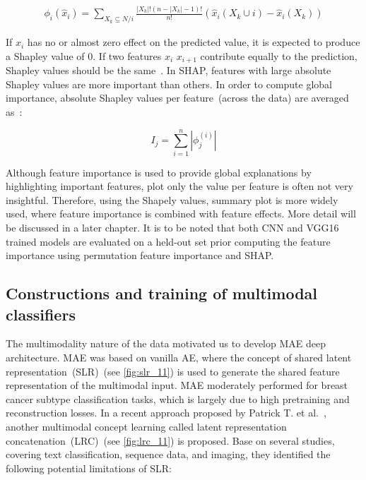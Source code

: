 \vspace{-2mm}
\begin{align}
    \phi_{i}(\hat x_i)=\sum_{X_k \subseteq N / i} \frac{|X_k| !(n-|X_k|-1) !}{n !}(\hat x_i(X_k \cup i)-\hat x_i(X_k))
    \label{eq:shap}
\end{align}

\hspace*{3.5mm} If $x_i$ has no or almost zero effect on the predicted value, it is expected to produce a Shapley value of 0. If two features $x_i$ $x_{i+1}$ contribute equally to the prediction, Shapley values should be the same~\cite{NIPS2017_7062}. In SHAP, features with large absolute Shapley values are more important than others. In order to compute global importance, absolute Shapley values per feature~(across the data) are averaged as~\cite{NIPS2017_7062}:

\begin{equation}
    I_{j}=\sum_{i=1}^{n}\left|\phi_{j}^{(i)}\right|
\end{equation}

\hspace*{3.5mm} Although feature importance is used to provide global explanations by highlighting important features, plot only the value per feature is often not very insightful. Therefore, using the Shapely values, summary plot is more widely used, where feature importance is combined with feature effects. More detail will be discussed in a later chapter. It is to be noted that both CNN and VGG16 trained models are evaluated on a held-out set prior computing the feature importance using permutation feature importance and SHAP.

\subsection{Constructions and training of multimodal classifiers}
The multimodality nature of the data motivated us to develop MAE deep architecture. MAE was based on vanilla AE, where the concept of shared latent representation~(SLR)~(see \cref{fig:slr_11}) is used to generate the shared feature representation of the multimodal input. MAE moderately performed for breast cancer subtype classification tasks, which is largely due to high pretraining and reconstruction losses.
In a recent approach proposed by Patrick T. et al.~\cite{mmdcae}, another multimodal concept learning called latent representation concatenation~(LRC)~(see \cref{fig:lrc_11}) is proposed. Base on several studies, covering text classification, sequence data, and imaging, they identified the following potential limitations of SLR: 

